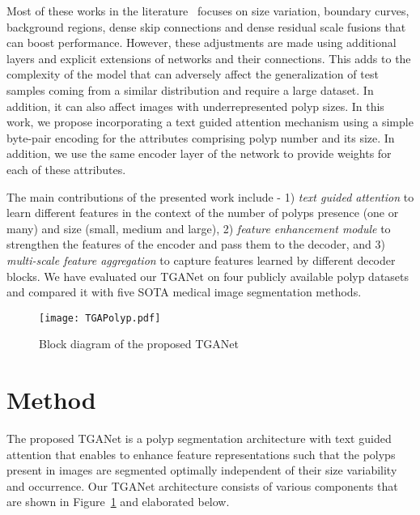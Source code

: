 \documentclass[runningheads]{llncs}
\begin{document}
Most of these works in the literature~\cite{fan2020pranet,shen2021hrenet,srivastava2021msrf} focuses on size variation, boundary curves, background regions, dense skip connections and dense residual scale fusions that can boost performance. However, these adjustments are made using additional layers and explicit extensions of networks and their connections. This adds to the complexity of the model that can adversely affect the generalization of test samples coming from a similar distribution and require a large dataset. In addition, it can also affect images with underrepresented polyp sizes. In this work, we propose incorporating a text guided attention mechanism using a simple byte-pair encoding for the attributes comprising polyp number and its size. In addition, we use the same encoder layer of the network to provide weights for each of these attributes. 

The main contributions of the presented work include - 1) \textit{text guided attention} to learn different features in the context of the number of polyps presence (one or many) and size (small, medium and large), 2) \textit{feature enhancement module} to strengthen the features of the encoder and pass them to the decoder, and 3) \textit{multi-scale feature aggregation} to capture features learned by different decoder blocks. We have evaluated our TGANet on four publicly available polyp datasets and compared it with five SOTA medical image segmentation methods.  

\begin{figure}[t!]
    \centering
    \texttt{[image: TGAPolyp.pdf]}
    \caption{Block diagram of the proposed TGANet}
    \label{fig:TGANet}
\end{figure}

\section{Method}{\label{section:method}}
The proposed TGANet is a polyp segmentation architecture with text guided attention that enables to enhance feature representations such that the polyps present in images are segmented optimally independent of their size variability and occurrence. Our TGANet architecture consists of various components that are shown in Figure~\ref{fig:TGANet} and elaborated below.
\end{document}
